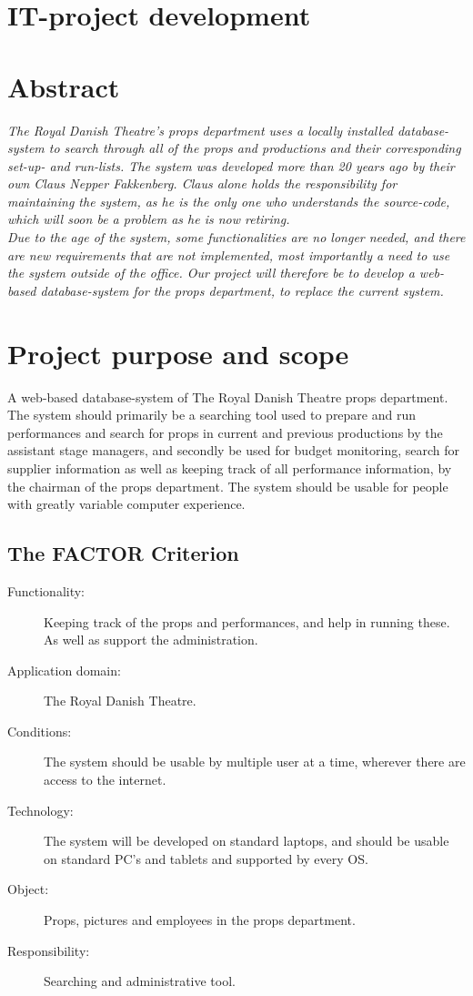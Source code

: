 \documentclass[12pt]{article}
\begin{document}
\section*{IT-project development}
\section{Abstract}
\textit{The Royal Danish Theatre's props department uses a locally installed database-system to search through all of the props and productions and their corresponding set-up- and run-lists. The system was developed more than 20 years ago by their own Claus Nepper Fakkenberg. Claus alone holds the responsibility for maintaining the system, as he is the only one who understands the source-code, which will soon be a problem as he is now retiring. \\
Due to the age of the system, some functionalities are no longer needed, and there are new requirements that are not implemented, most importantly a need to use the system outside of the office. Our project will therefore be to develop a web-based database-system for the props department, to replace the current system.}
\section{Project purpose and scope}
A web-based database-system of The Royal Danish Theatre props department. The system should primarily be a searching tool used to prepare and run performances and search for props in current and previous productions by the assistant stage managers, and secondly be used for budget monitoring, search for supplier information as well as keeping track of all performance information, by the chairman of the props department. The system should be usable for people with greatly variable computer experience.
\subsection{The FACTOR Criterion}
\begin{description}
  \item[Functionality:] Keeping track of the props and performances, and help in running these. As well as support the administration.
  \item[Application domain:] The Royal Danish Theatre.
  \item[Conditions:] The system should be usable by multiple user at a time, wherever there are access to the internet.
  \item[Technology:] The system will be developed on standard laptops, and should be usable on standard PC's and tablets and supported by every OS.
  \item[Object:] Props, pictures and employees in the props department.
  \item[Responsibility:] Searching and administrative tool.
\end{description}
\end{document}
